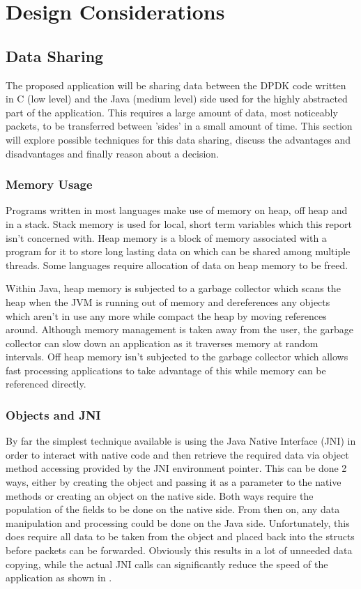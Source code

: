 \documentclass[final_report.tex]{subfiles}
\begin{document}
\section{Design Considerations}

\subsection{Data Sharing}
The proposed application will be sharing data between the DPDK code written in C (low level) and the Java (medium level) side used for the highly abstracted part of the application. This requires a large amount of data, most noticeably packets, to be transferred between 'sides' in a small amount of time. This section will explore possible techniques for this data sharing, discuss the advantages and disadvantages and finally reason about a decision.

\subsubsection{Memory Usage}

Programs written in most languages make use of memory on heap, off heap and in a stack. Stack memory is used for local, short term variables which this report isn't concerned with. Heap memory is a block of memory associated with a program for it to store long lasting data on which can be shared among multiple threads. Some languages require allocation of data on heap memory to be freed.

Within Java, heap memory is subjected to a garbage collector which scans the heap when the JVM is running out of memory and dereferences any objects which aren't in use any more while compact the heap by moving references around. Although memory management is taken away from the user, the garbage collector can slow down an application as it traverses memory at random intervals. Off heap memory isn't subjected to the garbage collector which allows fast processing applications to take advantage of this while memory can be referenced directly.

\subsubsection{Objects and JNI}
By far the simplest technique available is using the Java Native Interface (JNI) in order to interact with native code and then retrieve the required data via object method accessing provided by the JNI environment pointer. This can be done 2 ways, either by creating the object and passing it as a parameter to the native methods or creating an object on the native side. Both ways require the population of the fields to be done on the native side. From then on, any data manipulation and processing could be done on the Java side. Unfortunately, this does require all data to be taken from the object and placed back into the structs before packets can be forwarded. Obviously this results in a lot of unneeded data copying, while the actual JNI calls can significantly reduce the speed of the application as shown in .
\end{document}
